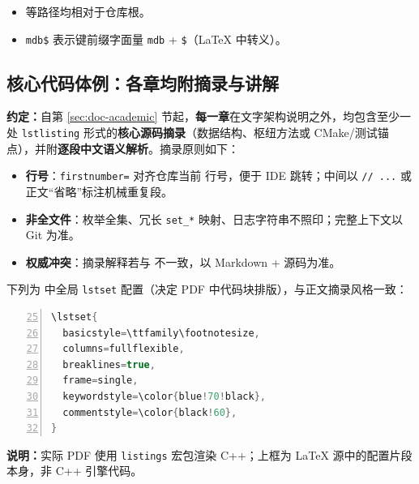 \begin{itemize}
  \item {} 等路径均相对于仓库根。
  \item \texttt{mdb\$} 表示键前缀字面量 \texttt{mdb} + \texttt{\$}（LaTeX 中转义）。
\end{itemize}

\subsection{核心代码体例：各章均附摘录与讲解}

\textbf{约定：}自第 \ref{sec:doc-academic} 节起，\textbf{每一章}在文字架构说明之外，均包含至少一处 \texttt{lstlisting} 形式的\textbf{核心源码摘录}（数据结构、枢纽方法或 CMake/测试锚点），并附\textbf{逐段中文语义解析}。摘录原则如下：

\begin{itemize}
  \item \textbf{行号}：\texttt{firstnumber=} 对齐仓库当前  行号，便于 IDE 跳转；中间以 \texttt{// ...} 或正文``省略''标注机械重复段。
  \item \textbf{非全文件}：枚举全集、冗长 \texttt{set\_*} 映射、日志字符串不照印；完整上下文以 Git 为准。
  \item \textbf{权威冲突}：摘录解释若与  不一致，以 Markdown + 源码为准。
\end{itemize}

下列为  中全局 \texttt{lstset} 配置（决定 PDF 中代码块排版），与正文摘录风格一致：

\begin{lstlisting}[language=C++, numbers=left, firstnumber=25]
\lstset{
  basicstyle=\ttfamily\footnotesize,
  columns=fullflexible,
  breaklines=true,
  frame=single,
  keywordstyle=\color{blue!70!black},
  commentstyle=\color{black!60},
}
\end{lstlisting}

\textbf{说明：}实际 PDF 使用 \texttt{listings} 宏包渲染 C++；上框为 LaTeX 源中的配置片段本身，非 C++ 引擎代码。
